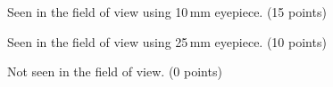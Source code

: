 Seen in the field of view using 10\,mm eyepiece. \hfill(15 points)

Seen in the field of view using 25\,mm eyepiece. \hfill(10 points)

Not seen in the field of view. \hfill(0 points)
